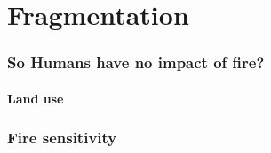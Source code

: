 \section{Fragmentation}

\begin{frame}
    \frametitle{So Humans have no impact of fire?}
    \framesubtitle{Land use}
\end{frame}

\begin{frame}
    \frametitle{Fire sensitivity}
\end{frame}
